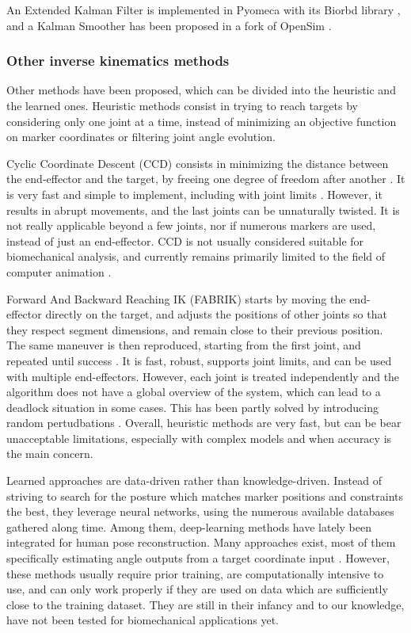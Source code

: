 An Extended Kalman Filter is implemented in Pyomeca with its Biorbd library \cite{Michaud2021}, and a Kalman Smoother has been proposed in a fork of OpenSim \cite{DeGroote2008}.



\subsubsection{Other inverse kinematics methods}

Other methods have been proposed, which can be divided into the heuristic and the learned ones. Heuristic methods consist in trying to reach targets by considering only one joint at a time, instead of minimizing an objective function on marker coordinates or filtering joint angle evolution. 

Cyclic Coordinate Descent (CCD) consists in minimizing the distance between the end-effector and the target, by freeing one degree of freedom after another \cite{Wang1991}. It is very fast and simple to implement, including with joint limits \cite{Welman1993}. However, it results in abrupt movements, and the last joints can be unnaturally twisted. It is not really applicable beyond a few joints, nor if numerous markers are used, instead of just an end-effector. CCD is not usually considered suitable for biomechanical analysis, and currently remains primarily limited to the field of computer animation \cite{Kulpa2005}. 

Forward And Backward Reaching IK (FABRIK) starts by moving the end-effector directly on the target, and adjusts the positions of other joints so that they respect segment dimensions, and remain close to their previous position. The same maneuver is then reproduced, starting from the first joint, and repeated until success \cite{Aristidou2011}. It is fast, robust, supports joint limits, and can be used with multiple end-effectors. However, each joint is treated independently and the algorithm does not have a global overview of the system, which can lead to a deadlock situation in some cases. This has been partly solved by introducing random pertudbations \cite{Aristidou2016}. Overall, heuristic methods are very fast, but can be bear unacceptable limitations, especially with complex models and when accuracy is the main concern.

Learned approaches are data-driven rather than knowledge-driven. Instead of striving to search for the posture which matches marker positions and constraints the best, they leverage neural networks, using the numerous available databases gathered along time. Among them, deep-learning methods have lately been integrated for human pose reconstruction. Many approaches exist, most of them specifically estimating angle outputs from a target coordinate input \cite{Mordatch2015,Du2015}. However, these methods usually require prior training, are computationally intensive to use, and can only work properly if they are used on data which are sufficiently close to the training dataset. They are still in their infancy and to our knowledge, have not been tested for biomechanical applications yet.


